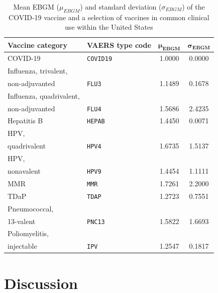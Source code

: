 \documentclass[preprints,communication,submit,oneauthor,pdftex]{Definitions/mdpi}
\begin{document}
\begin{table}[]
\begin{tabular}{l  l  c  c}
\textbf{Vaccine category}                        & \textbf{VAERS type code} & $\mathbf{\mu_{EBGM}}$ & $\mathbf{\sigma_{EBGM}}$ \\
\hline
COVID-19                                & \texttt{COVID19}         & 1.0000    & 0.0000                     \\
\hline
Influenza, trivalent, \\ non-adjuvanted    & \texttt{FLU3}            & 1.1489    & 0.1678                     \\
\hline
Influenza, quadrivalent, \\ non-adjuvanted & \texttt{FLU4}            & 1.5686    & 2.4235                     \\
\hline
Hepatitis B                             & \texttt{HEPAB}           & 1.4450    & 0.0071                     \\
\hline
HPV, \\ quadrivalent                       & \texttt{HPV4}            & 1.6735    & 1.5137                     \\
\hline
HPV, \\ nonavalent                         & \texttt{HPV9}            & 1.4454    & 1.1111                     \\
\hline
MMR                                     & \texttt{MMR}             & 1.7261    & 2.2000                     \\
\hline
TDaP                                    & \texttt{TDAP}            & 1.2723    & 0.7551                     \\
\hline
Pneumococcal, \\ 13-valent                 & \texttt{PNC13}           & 1.5822    & 1.6693                     \\
\hline
Poliomyelitis, \\ injectable               & \texttt{IPV}             & 1.2547    & 0.1817                    
\end{tabular}
\caption{Mean EBGM ($\mu_{EBGM}$) and standard deviation ($\sigma_{EBGM}$) of the COVID-19 vaccine and a selection of vaccines in common clinical use within the United States}
\label{tab:comparison_ebgm}
\end{table}



\section{Discussion} %
\label{sec:discussion}
\end{document}
